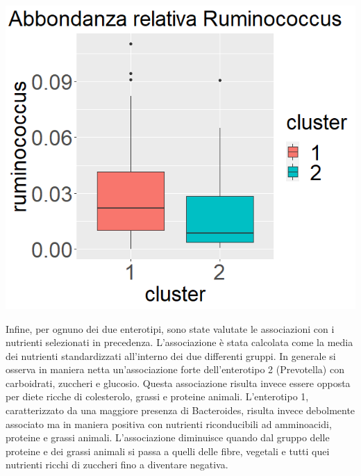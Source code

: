 \begin{Figure}
\begin{multicols}{3}
                \includegraphics[width=\linewidth,keepaspectratio]{images/real_ruminococcus.png}
        \end{multicols}
  \end{Figure}
 \vspace*{1cm}
Infine, per ognuno dei due enterotipi, sono state valutate le associazioni con i nutrienti selezionati in precedenza. L’associazione è stata calcolata come la media dei nutrienti standardizzati all’interno dei due differenti gruppi.
In generale si osserva in maniera netta un'associazione forte dell’enterotipo 2 (Prevotella) con carboidrati, zuccheri e glucosio. Questa associazione risulta invece essere opposta per diete ricche di colesterolo, grassi e proteine animali. L’enterotipo 1, caratterizzato da una maggiore presenza di Bacteroides, risulta invece debolmente associato ma in maniera positiva con nutrienti riconducibili ad amminoacidi, proteine e grassi animali. L’associazione diminuisce quando dal gruppo delle proteine e dei grassi animali si passa a quelli delle fibre, vegetali e tutti quei nutrienti ricchi di zuccheri fino a diventare negativa.\\

